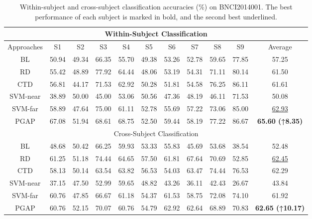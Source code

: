 \documentclass[journal,twocolumn]{IEEEtran}
\begin{document}
\begin{table}[htpb] \centering
  \caption{Within-subject and cross-subject classification accuracies (\%) on BNCI2014001. The best performance of each subject is marked in bold, and the second best underlined.}
  \label{tab:2014001-result}
  \begin{tabular}{c|c|c|c|c|c|c|c|c|c|c}
  \toprule
  \multicolumn{11}{c}{Within-Subject Classification} \\
  \midrule
  Approaches & S1 & S2 & S3 & S4 & S5 & S6 & S7 & S8 & S9 & Average \\
  \midrule
  BL & 50.94 & 49.34 & 66.35 & 55.70 & 49.38 & 53.26 & 52.78 & 59.65 & 77.85 & 57.25 \\
  RD & 55.42 & 48.89 & 77.92 & 64.44 & 48.06 & 53.19 & 54.31 & 71.11 & 80.14 & 61.50 \\
  CTD & 56.81 & 44.17 & 71.53 & 62.92 & 50.28 & 51.81 & 54.58 & 76.25 & 86.11 & 61.61 \\
  SVM-near & 38.89 & 50.00 & 45.00 & 53.06 & 50.56 & 47.36 & 48.19 & 46.11 & 71.53 & 50.08 \\
  SVM-far & 58.89 & 47.64 & 75.00 & 61.11 & 52.78 & 55.69 & 57.22 & 73.06 & 85.00 & \underline{62.93} \\
  PGAP & 67.08 & 51.94 & 68.61 & 68.75 & 52.50 & 59.44 & 58.19 & 77.22 & 86.67 & \textbf{65.60 (↑8.35)} \\
  \midrule
  \multicolumn{11}{c}{Cross-Subject Classification} \\
  \midrule
  BL & 48.68 & 50.42 & 66.25 & 59.93 & 53.33 & 55.83 & 45.69 & 53.68 & 38.54 & 52.48 \\
  RD & 61.25 & 51.18 & 74.44 & 64.65 & 57.50 & 61.81 & 67.64 & 70.69 & 52.85 & \underline{62.45} \\
  CTD & 58.13 & 50.14 & 63.54 & 63.82 & 56.53 & 54.03 & 63.47 & 74.44 & 76.53 & 62.29 \\
  SVM-near & 37.15 & 47.50 & 52.99 & 59.65 & 48.82 & 43.26 & 36.11 & 42.43 & 26.67 & 43.84 \\
  SVM-far & 60.76 & 47.85 & 66.67 & 61.18 & 54.37 & 61.53 & 58.75 & 72.08 & 74.10 & 61.92 \\
  PGAP & 60.76 & 52.15 & 70.07 & 60.76 & 54.79 & 62.92 & 62.64 & 68.89 & 70.83 & \textbf{62.65 (↑10.17)} \\
  \bottomrule
  \end{tabular}
\end{table}
\end{document}
